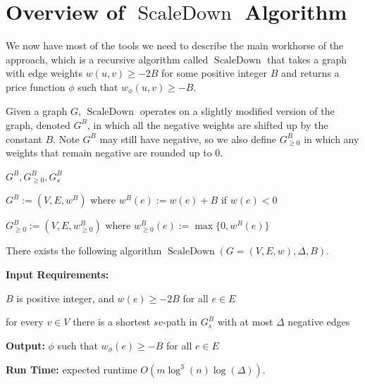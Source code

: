 \documentclass[11pt]{article}
\newcommand{\ScaleDown}{\operatorname{ScaleDown}}
\newcommand{\GB}{G^{B}}
\newcommand{\wB}{w^{B}}
\newenvironment{tight_enumerate}{
\begin{enumerate}
 \setlength{\itemsep}{2pt}
 \setlength{\parskip}{1pt}
}{\end{enumerate}}
\begin{document}
\section{Overview of $\ScaleDown$ Algorithm}
We now have most of the tools we need to describe the main workhorse of the approach, which is a recursive algorithm called $\ScaleDown$ that takes
a graph with edge weights $w(u,v) \geq -2B$ for some positive integer $B$ and returns a price function $\phi$ such that $w_\phi(u,v) \geq -B$.

Given a graph $G$, $\ScaleDown$ operates on a slightly modified version of the graph, denoted $\GB$, in which all the negative weights are shifted up by the constant $B$. Note $\GB$ may still have negative, so we also define $\GB_{\geq 0}$ in which any weights that remain negative are rounded up to 0.
\begin{definition}{$\GB, \GB_{\geq 0}, \GB_s$}

    $\GB:=(V, E, \wB)$  where $\wB(e) := w(e) + B$ if $w(e) < 0$

    $\GB_{\geq 0}:=(V, E, \wB_{\geq 0})$ where $\wB_{\geq 0}(e) := \max \{0, \wB(e) \}$

\end{definition}


\begin{theorem}[$\ScaleDown$]
\label{thm:scaledown}
There exists the following algorithm $\ScaleDown(G = (V,E,w),\Delta,B)$.
\begin{tight_enumerate}
    \item \textbf{Input Requirements:} \label{item:ScaleDown input}
    \begin{tight_enumerate}
        \item\label{prop:scaledown:weight} $B$ is positive integer, and $w(e) \geq -2B$ for all $e \in E$
        \item\label{prop:scaledown:Delta} 
        for every $v \in V$  
        there is a shortest $sv$-path in $\GB_s$ with at most $\Delta$ negative edges \label{item:ScaleDown input b}
    \end{tight_enumerate}
    \item \label{item:ScaleDown Output} \textbf{Output:} $\phi$ such that $w_{\phi}(e) \geq -B$ for all $e \in E$
    \item \textbf{Run Time:}\label{item:ScaleDown Runtime} expected runtime $O\left(m\log^3(n)\log(\Delta)\right)$.
\end{tight_enumerate}

\end{theorem}
\end{document}

